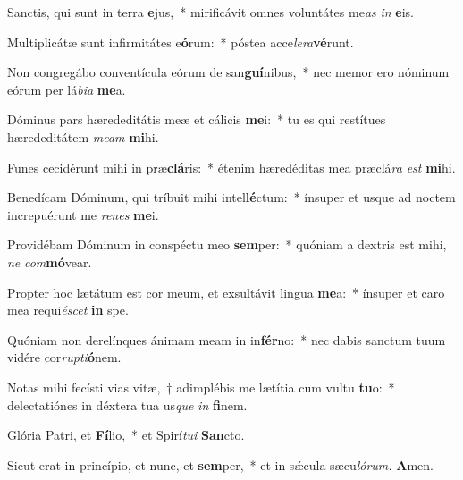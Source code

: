 \item Sanctis, qui sunt in terra \textbf{e}jus,~* mirificávit omnes voluntátes me\textit{as} \textit{in} \textbf{e}is.
\item Multiplicátæ sunt infirmitátes e\textbf{ó}rum:~* póstea acce\textit{lera}\textbf{vé}runt.
\item Non congregábo conventícula eórum de san\textbf{guí}nibus,~* nec memor ero nóminum eórum per lá\textit{bia} \textbf{me}a.
\item Dóminus pars hærededitátis meæ et cálicis \textbf{me}i:~* tu es qui restítues hærededitátem \textit{meam} \textbf{mi}hi.
\item Funes cecidérunt mihi in præ\textbf{clá}ris:~* étenim hæredéditas mea præclá\textit{ra} \textit{est} \textbf{mi}hi.
\item Benedícam Dóminum, qui tríbuit mihi intel\textbf{lé}ctum:~* ínsuper et usque ad noctem increpuérunt me \textit{renes} \textbf{me}i.
\item Providébam Dóminum in conspé\-ctu meo \textbf{sem}per:~* quóniam a dextris est mihi, \textit{ne} \textit{com}\textbf{mó}vear.
\item Propter hoc lætátum est cor meum, et exsultávit lingua \textbf{me}a:~* ínsuper et caro mea requi\textit{éscet} \textbf{in} spe.
\item Quóniam non derelínques ánimam meam in in\textbf{fér}no:~* nec dabis san\-ctum tuum vidére cor\textit{rupti}\textbf{ó}nem.
\item Notas mihi fecísti vias vitæ,~† adimplébis me lætítia cum vultu \textbf{tu}o:~* dele\-ctatiónes in déxtera tua us\textit{que} \textit{in} \textbf{fi}nem.
\item Glória Patri, et \textbf{Fí}lio,~* et Spirí\hspace{0.03em}\textit{tui} \textbf{San}cto.
\item Sicut erat in princípio, et nunc, et \textbf{sem}per,~* et in sǽcula sæcu\hspace{0.03em}\textit{lórum.} \textbf{A}men.
